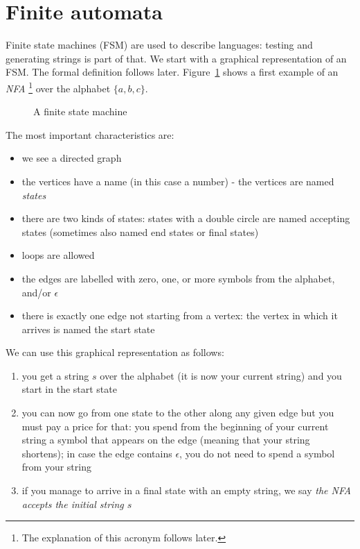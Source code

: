 \section{Finite automata}

Finite state machines (FSM) are used to describe languages: testing
and generating strings is part of that. We start with a
graphical representation of an FSM. The formal definition follows
later. Figure~\ref{fsa1} shows a first example of an {\em
  NFA} \footnote{The explanation of this acronym follows later.} over
the alphabet $\{a,b,c\}$.

\begin{figure}[h]
\caption{A finite state machine\label{fsa1}}
\end{figure}

The most important characteristics are:

\begin{itemize}
\item we see a directed graph
\item the vertices have a name (in this case a number) - the vertices
  are named {\em states}
\item there are two kinds of states: states with a double circle are
  named accepting states (sometimes also named end states or final
  states)
\item loops are allowed
\item the edges are labelled with zero, one, or more symbols from the
  alphabet, and/or $\epsilon$
\item there is exactly one edge not starting from a vertex: the vertex
  in which it arrives is named the start state
\end{itemize}

We can use this graphical representation as follows:

\begin{enumerate}
\item you get a string $s$ over the alphabet (it is now your current
  string) and you start in the start state
\item you can now go from one state to the other along any given
  edge but you must pay a price for that: you spend from the beginning
  of your current string a symbol that appears on the edge (meaning
  that your string shortens); in case the edge contains $\epsilon$,
  you do not need to spend a symbol from your string
\item if you manage to arrive in a final state with an empty string,
  we say {\em the NFA accepts the initial string $s$}
\end{enumerate}

